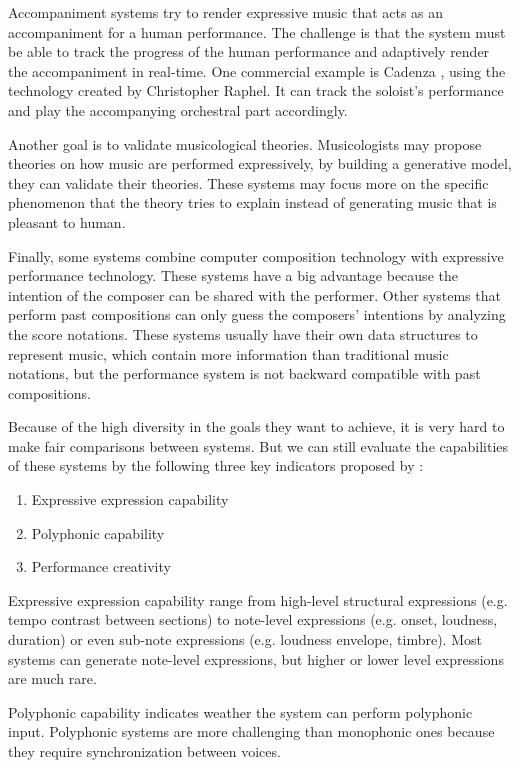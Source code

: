 Accompaniment systems try to render expressive music that acts as an accompaniment for a human performance. The challenge is that the system must be able to track the progress of the human performance and adaptively render the accompaniment in real-time. One commercial example is Cadenza \cite{cadenza}, using the technology created by Christopher Raphel. It can track the soloist's performance and play the accompanying orchestral part accordingly.


Another goal is to validate musicological theories. Musicologists may propose theories on how music are performed expressively, by building a generative model, they can validate their theories. These systems may focus more on the specific phenomenon that the theory tries to explain instead of generating music that is pleasant to human. 


Finally, some systems combine computer composition technology with expressive performance technology. These systems have a big advantage because the intention of the composer can be shared with the performer. Other systems that perform past compositions can only guess the composers' intentions by analyzing the score notations. These systems usually have their own data structures to represent music, which contain more information than traditional music notations, but the performance system is not backward compatible with past compositions.


Because of the high diversity in the goals they want to achieve, it is very hard to make fair comparisons between systems. But we can still evaluate the capabilities of these systems by the following three key indicators proposed by \cite{THEBOOK}:
\begin{enumerate}
   \item Expressive expression capability
   \item Polyphonic capability
   \item Performance creativity
\end{enumerate}

Expressive expression capability range from high-level structural expressions (e.g. tempo contrast between sections) to note-level expressions (e.g. onset, loudness, duration) or even sub-note expressions (e.g. loudness envelope, timbre). Most systems can generate note-level expressions, but higher or lower level expressions are much rare.

Polyphonic capability indicates weather the system can perform polyphonic input. Polyphonic systems are more challenging than monophonic ones because they require synchronization between voices. 

